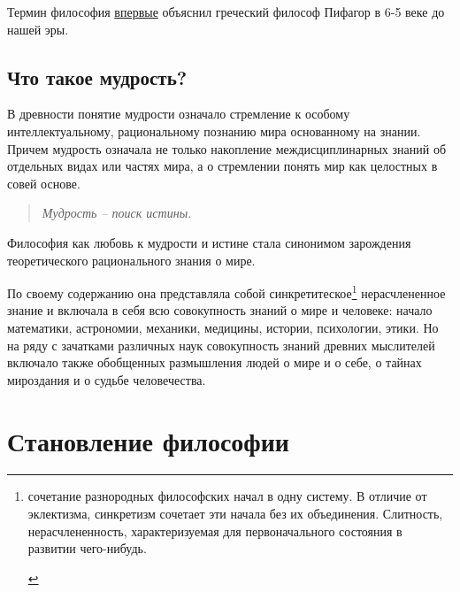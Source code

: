\documentclass[
]{article}
\providecommand{\tightlist}{%
  \setlength{\itemsep}{0pt}\setlength{\parskip}{0pt}}
\begin{document}
Термин философия
\protect\hyperlink{ux438ux441ux442ux43eux440ux438ux44f-ux444ux438ux43bux43eux441ux43eux444ux438ux438}{впервые}
объяснил греческий философ Пифагор в 6-5 веке до нашей эры.

\hypertarget{ux447ux442ux43e-ux442ux430ux43aux43eux435-ux43cux443ux434ux440ux43eux441ux442ux44c}{%
\subsection{Что такое
мудрость?}\label{ux447ux442ux43e-ux442ux430ux43aux43eux435-ux43cux443ux434ux440ux43eux441ux442ux44c}}

В древности понятие мудрости означало стремление к особому
интеллектуальному, рациональному познанию мира основанному на знании.
Причем мудрость означала не только накопление междисциплинарных знаний
об отдельных видах или частях мира, а о стремлении понять мир как
целостных в совей основе.

\begin{quote}
\emph{Мудрость -- поиск истины.}
\end{quote}

Философия как любовь к мудрости и истине стала синонимом зарождения
теоретического рационального знания о мире.

По своему содержанию она представляла собой синкретитеское\footnote{\begin{description}
  \tightlist
  \item[\emph{Синкретизм (др.-греч.объединение)} ---]
  сочетание разнородных философских начал в одну систему. В отличие от
  эклектизма, синкретизм сочетает эти начала без их объединения.
  Слитность, нерасчлененность, характеризуемая для первоначального
  состояния в развитии чего-нибудь.
  \end{description}} нерасчлененное знание и включала в себя всю
совокупность знаний о мире и человеке: начало математики, астрономии,
механики, медицины, истории, психологии, этики. Но на ряду с зачатками
различных наук совокупность знаний древних мыслителей включало также
обобщенных размышления людей о мире и о себе, о тайнах мироздания и о
судьбе человечества.

\hypertarget{ux441ux442ux430ux43dux43eux432ux43bux435ux43dux438ux435-ux444ux438ux43bux43eux441ux43eux444ux438ux438}{%
\section{Становление
философии}\label{ux441ux442ux430ux43dux43eux432ux43bux435ux43dux438ux435-ux444ux438ux43bux43eux441ux43eux444ux438ux438}}
\end{document}

